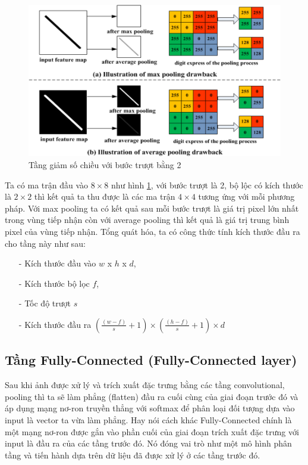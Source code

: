 \begin{center}
\begin{figure}[H]
	\begin{center}
		\includegraphics[scale=0.5]{chap3/image/cnn/pooling/pooling.png}
	\end{center}
	\caption{Tầng giảm số chiều với bước trượt bằng 2}
	\label{fig:pool}
\end{figure}
\end{center}
Ta có ma trận đầu vào $8\times 8$  như hình \ref{fig:pool}, với bước trượt là 2, bộ lộc có kích thước là $2\times 2$ thì kết quả ta thu được là các ma trận $4\times 4$ tương ứng với mỗi phương pháp. Với max pooling ta có kết quả sau mỗi bước trượt là giá trị pixel lớn nhất trong vùng tiếp nhận còn với average pooling thì kết quả là giá trị trung bình pixel của vùng tiếp nhận. Tổng quát hóa, ta có công thức tính kích thước đầu ra cho tầng này như sau:
\begin{itemize}
	\item[-] Kích thước đầu vào \textbf{$w$} x \textbf{$h$} x \textbf{$d$},
	\item[-] Kích thước bộ lọc \textbf{$f$},	
	\item[-] Tốc độ trượt \textbf{$s$}
	\item[-] Kích thước đầu ra $(\frac{(w-f)}{s}+1) \times (\frac{(h-f)}{s} +1) \times d$ 
\end{itemize}
\subsection{Tầng Fully-Connected (Fully-Connected layer)}
  Sau khi ảnh được xử lý và trích xuất đặc trưng bằng các tầng convolutional, pooling thì ta sẽ làm phẳng (flatten) đầu ra cuối cùng của giai đoạn trước đó và áp dụng mạng nơ-ron truyền thẳng với softmax để phân loại đối tượng dựa vào input là vector ta vừa làm phẳng. Hay nói cách khác Fully-Connected chính là một mạng nơ-ron được gắn vào phần cuối của giai đoạn trích xuất đặc trưng với input là đầu ra của các tầng trước đó. Nó đóng vai trò như một mô hình phân tầng và tiến hành dựa trên dữ liệu đã được xử lý ở các tầng trước đó.
